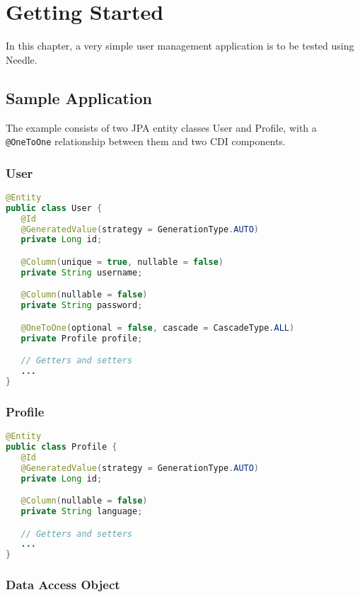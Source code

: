 \chapter{Getting Started}
In this chapter, a very simple user management application is to be tested using Needle.

\section{Sample Application}
\label{sec: Sample Application}

The example consists of two JPA entity classes User and Profile, with a \verb|@OneToOne| relationship between them and two CDI components.

\subsection{User}
\begin{lstlisting}[language={JAVA},caption=The user entity]
@Entity
public class User {
   @Id
   @GeneratedValue(strategy = GenerationType.AUTO)
   private Long id;

   @Column(unique = true, nullable = false)
   private String username;

   @Column(nullable = false)
   private String password;

   @OneToOne(optional = false, cascade = CascadeType.ALL)
   private Profile profile;

   // Getters and setters
   ...
}
\end{lstlisting}

\subsection{Profile}

\begin{lstlisting}[language={JAVA},caption=The profile entity]
@Entity
public class Profile {
   @Id
   @GeneratedValue(strategy = GenerationType.AUTO)
   private Long id;

   @Column(nullable = false)
   private String language;

   // Getters and setters
   ...
}
\end{lstlisting}

\subsection{Data Access Object}

